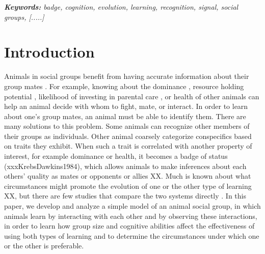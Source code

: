 \textit{\textbf{Keywords:} badge, cognition, evolution, learning, recognition, signal, social groups,  [.....]}

\newpage
\section*{Introduction} 
Animals in social groups benefit from having accurate information about their group mates \cite{Seyfarth:2010bh}. For example, knowing about the dominance \cite{Hobson:2015kx,Hobson:2015uq,Flack:2006fk,Brush:2013fk,Flack:2006uq,Cowlishaw:1990vn,Waal:1986ys,Seyfarth:2005ve,Bergman:2003qf}, resource holding potential \cite{Arnott:2009zr,Lemel:1993ve,Dick:1990cr}, likelihood of investing in parental care \cite{Olsen:2010uq,Qvarnstrom:1997fk}, or health \cite{Folstad:1992kx,Loyau:2005nx} of other animals can help an animal decide with whom to fight, mate, or interact. In order to learn about one's group mates, an animal must be able to identify them. There are many solutions to this problem. Some animals can recognize other members of their groups as individuals. Other animal coarsely categorize conspecifics based on traits they exhibit. When such a trait is correlated with another property of interest, for example dominance or health, it becomes a badge of status (xxxKrebsDawkins1984), which allows animals to make inferences about each others' quality as mates or opponents or allies XX. Much is known about what circumstances might promote the evolution of one or the other type of learning XX, but there are few studies that compare the two systems directly \cite{sheehan2016evotradeoff}. In this paper, we develop and analyze a simple model of an animal social group, in which animals learn by interacting with each other and by observing these interactions, in order to learn how group size and cognitive abilities affect the effectiveness of using both types of learning and to determine the circumstances under which one or the other is preferable. 

